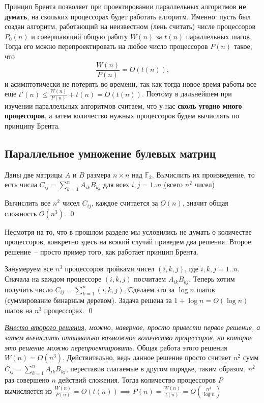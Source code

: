  Принцип Брента позволяет при проектировании параллельных алгоритмов \textbf{не думать}, на скольких процессорах будет работать алгоритм. Именно: пусть был создан алгоритм, работающий на неизвестном (лень считать) числе процессоров $P_0(n)$ и совершающий общую работу $W(n)$ за $t(n)$ параллельных шагов. Тогда его можно перепроектировать на любое число процессоров $P(n)$ такое, что $$\frac{W(n)}{P(n)} = O(t(n)),$$ и асимптотически не потерять во времени, так как тогда новое время работы все еще $t'(n) \leq \frac{W(n)}{P(n)} + t(n) = O(t(n))$. Поэтому в дальнейшем при изучении параллельных алгоритмов считаем, что у нас \textbf{сколь угодно много процессоров}, а затем количество нужных процессоров будем вычислять по принципу Брента.

\subsection{Параллельное умножение булевых матриц}

\begin{problem*}
	Даны две матрицы $A$ и $B$ размера $n\times n$ над $\mathbb F_2$. Вычислить их произведение, то есть числа $C_{ij} = \sum_{k=1}^n A_{ik}B_{kj}$  для всех $i, j=1..n$ (всего $n^2$  чисел)
\end{problem*}

 Вычислить все $n^2$ чисел $C_{ij}$, каждое считается за $O(n)$, значит общая сложность $O(n^3)$.  \qed

Несмотря на то, что в прошлом разделе мы условились не думать о количестве процессоров, конкретно здесь на всякий случай приведем два решения. Второе решение~-- просто пример того, как работает принцип Брента.

 Занумеруем все $n^3$ процессоров тройками чисел $(i, k, j)$, где $i,k,j=1..n$. Сначала на каждом процессоре $(i, k, j)$ посчитаем $A_{ik}B_{kj}$. Теперь хотим получить число $C_{ij} = \sum_{k=1}^n (i, k, j)$, Сделаем это за $\log n$ шагов (суммирование бинарным деревом). Задача решена за $1+\log n = O(\log n) $ шагов на $n^3$ процессорах. \qed

\textit{\underline{Вместо второго решения}, можно, наверное, просто привести первое решение, а затем вычислить оптимально возможное количество процессоров, на которое это решение можно перепроектировать.} Общая работа этого решения $W(n) = O(n^3)$. Действительно, ведь данное решение просто считает $n^2$ сумм $C_{ij} = \sum_{k=1}^n A_{ik}B_{kj}$, переставив слагаемые в другом порядке, таким образом, $n^2$ раз совершено $n$ действий сложения. Тогда количество процессоров $P$ вычисляется из $\frac{W(n)}{P(n)} = O(t(n)) \implies P(n) = \frac{W(n)}{t(n)} = O\left(\frac{n^3}{\log n}\right)$

